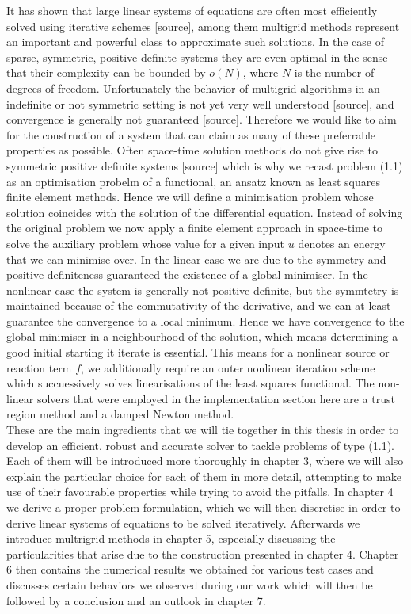 \documentclass[../draft_1.tex]{subfiles}
\begin{document}
It has shown that large linear systems of equations are often most efficiently solved using iterative schemes [source], among them multigrid methods represent an important and powerful class to approximate such solutions. In the case of sparse, symmetric, positive definite systems they are even optimal in the sense that their complexity can be bounded by $o(N)$, where $N$ is the number of degrees of freedom. Unfortunately the behavior of multigrid algorithms in an indefinite or not symmetric setting is not yet very well understood [source], and convergence is generally not guaranteed [source]. Therefore we would like to aim for the construction of a system that can claim as many of these preferrable properties as possible. Often space-time solution methods do not give rise to symmetric positive definite systems [source] which is why we recast problem (1.1) as an optimisation probelm of a functional, an ansatz known as least squares finite element methods. Hence we will define a minimisation problem whose solution coincides with the solution of the differential equation. Instead of solving the original problem we now apply a finite element approach in space-time to solve the auxiliary problem whose value for a given input $u$ denotes an energy that we can minimise over. In the linear case we are due to the symmetry and positive definiteness guaranteed the existence of a global minimiser. In the nonlinear case the system is generally not positive definite, but the symmtetry is maintained because of the commutativity of the derivative, and we can at least guarantee the convergence to a local minimum. Hence we have convergence to the global minimiser in a neighbourhood of the solution, which means determining a good initial starting it iterate is essential. This means for a nonlinear source or reaction term $f$, we additionally require an outer nonlinear iteration scheme which succuessively solves linearisations of the least squares functional. The non-linear solvers that were employed in the implementation section here are a trust region method and a damped Newton method.
\smallskip
\\
These are the main ingredients that we will tie together in this thesis in order to develop an efficient, robust and accurate solver to tackle problems of type (1.1). Each of them will be introduced more thoroughly in chapter 3, where we will also explain the particular choice for each of them in more detail, attempting to make use of their favourable properties while trying to avoid the pitfalls. In chapter 4 we derive a proper problem formulation, which we will then discretise in order to derive linear systems of equations to be solved iteratively. Afterwards we introduce multrigrid methods in chapter 5, especially discussing the particularities that arise due to the construction presented in chapter 4. Chapter 6 then contains the numerical results we obtained for various test cases and discusses certain behaviors we observed during our work which will then be followed by a conclusion and an outlook in chapter 7. 
\end{document}
